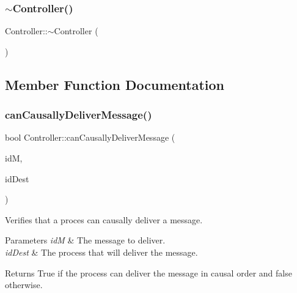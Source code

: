 \mbox{\label{class_controller_a0ab87934c4f7a266cfdb86e0f36bc1b5}} 
\subsubsection{\texorpdfstring{$\sim$\+Controller()}{~Controller()}}
{\footnotesize\ttfamily Controller\+::$\sim$\+Controller (\begin{DoxyParamCaption}{ }\end{DoxyParamCaption})\hspace{0.3cm}{\ttfamily [virtual]}}



\subsection{Member Function Documentation}
\mbox{\label{class_controller_ab57c4459f002be63b4deda1d7c3c3e29}} 
\subsubsection{\texorpdfstring{can\+Causally\+Deliver\+Message()}{canCausallyDeliverMessage()}}
{\footnotesize\ttfamily bool Controller\+::can\+Causally\+Deliver\+Message (\begin{DoxyParamCaption}\item[{\hyperlink{structures_8h_a83a1d9a070efa5341da84cfd8e28d3e5}{id\+Msg}}]{idM,  }\item[{unsigned int}]{id\+Dest }\end{DoxyParamCaption})}



Verifies that a proces can causally deliver a message. 


\begin{DoxyParams}{Parameters}
{\em idM} & The message to deliver. \\
\hline
{\em id\+Dest} & The process that will deliver the message. \\
\hline
\end{DoxyParams}
\begin{DoxyReturn}{Returns}
True if the process can deliver the message in causal order and false otherwise. 
\end{DoxyReturn}
\mbox{\label{class_controller_ab250759d5c511ceb8f35fdf9e42583cd}} 
